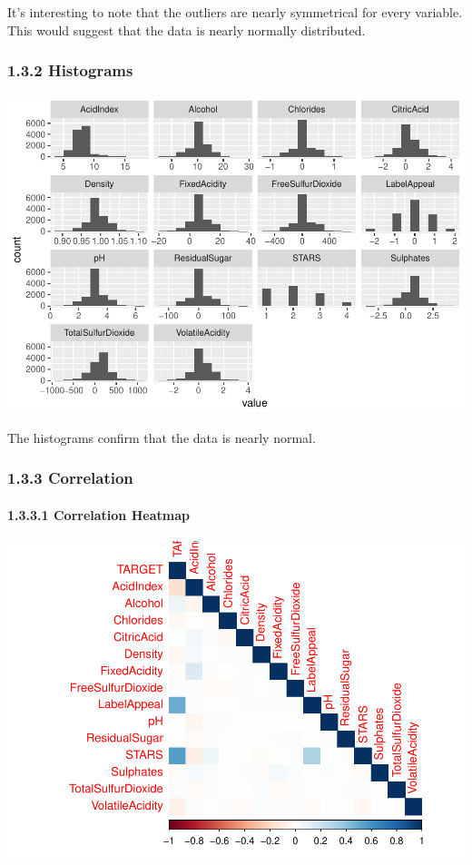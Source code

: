 \documentclass[]{article}
\let\oldparagraph\paragraph
\renewcommand{\paragraph}[1]{\oldparagraph{#1}\mbox{}}
\begin{document}
It's interesting to note that the outliers are nearly symmetrical for
every variable. This would suggest that the data is nearly normally
distributed.

\hypertarget{histograms}{%
\subsubsection{1.3.2 Histograms}\label{histograms}}

\includegraphics{DATA_621_Homework_5_files/figure-latex/summary-histogram-1.pdf}

The histograms confirm that the data is nearly normal.

\hypertarget{correlation}{%
\subsubsection{1.3.3 Correlation}\label{correlation}}

\hypertarget{correlation-heatmap}{%
\paragraph{1.3.3.1 Correlation Heatmap}\label{correlation-heatmap}}

\includegraphics{DATA_621_Homework_5_files/figure-latex/summary-correlation-heatmap-1.pdf}
\end{document}
